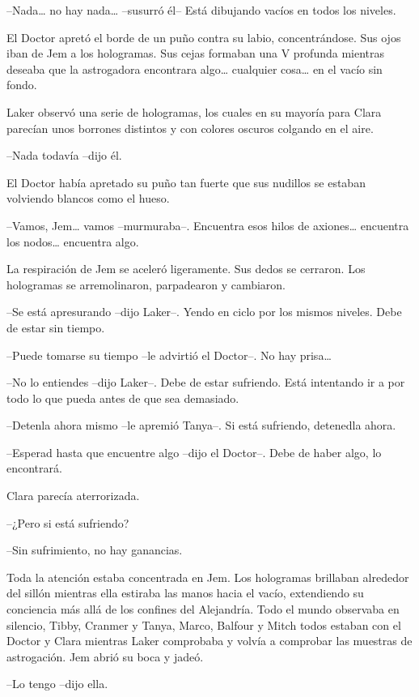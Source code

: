 {--Nada\ldots{} no hay nada\ldots{} --susurró él-- Está dibujando vacíos
en todos los niveles.}

{El Doctor apretó el borde de un puño contra su labio, concentrándose.
 Sus ojos iban de Jem a los hologramas. Sus cejas formaban una V profunda
 mientras deseaba que la astrogadora encontrara algo\ldots{} cualquier
 cosa\ldots{} en el vacío sin fondo.}

{Laker observó una serie de hologramas, los cuales en su mayoría para
 Clara parecían unos borrones distintos y con colores oscuros colgando en
el aire.}

{--Nada todavía --dijo él.}

{El Doctor había apretado su puño tan fuerte que sus nudillos se estaban
volviendo blancos como el hueso.}

{--Vamos, Jem\ldots{} vamos --murmuraba--. Encuentra esos hilos de
 axiones\ldots{} encuentra los nodos\ldots{} encuentra algo.}

{La respiración de Jem se aceleró ligeramente. Sus dedos se cerraron. Los
hologramas se arremolinaron, parpadearon y cambiaron.}

{--Se está apresurando --dijo Laker--. Yendo en ciclo por los mismos
niveles. Debe de estar sin tiempo.}

{--Puede tomarse su tiempo --le advirtió el Doctor--. No hay
 prisa\ldots{}}

{--No lo entiendes --dijo Laker--. Debe de estar sufriendo. Está
intentando ir a por todo lo que pueda antes de que sea demasiado.}

{--Detenla ahora mismo --le apremió Tanya--. Si está sufriendo, detenedla
ahora.}

{--Esperad hasta que encuentre algo --dijo el Doctor--. Debe de haber
algo, lo encontrará.}

{Clara parecía aterrorizada.}

{--¿Pero si está sufriendo?}

{--Sin sufrimiento, no hay ganancias.}

{Toda la atención estaba concentrada en Jem. Los hologramas brillaban
 alrededor del sillón mientras ella estiraba las manos hacia el vacío,
 extendiendo su conciencia más allá de los confines del Alejandría. Todo
 el mundo observaba en silencio, Tibby, Cranmer y Tanya, Marco, Balfour y
 Mitch todos estaban con el Doctor y Clara mientras Laker comprobaba y
 volvía a comprobar las muestras de astrogación. Jem abrió su boca y
jadeó.}

{--Lo tengo --dijo ella.}

